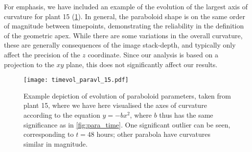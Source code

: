 For emphasis, we have included an example of the evolution of the largest axis
of curvature for plant 15 (\cref{fig:timeevol_ex}). In general, the paraboloid
shape is on the same order of magnitude between timepoints, demonstrating the reliability in
the definition of the geometric apex. While there are some variations in the
overall curvature, these are generally consequences of the image stack-depth,
and typically only affect the precision of the $z$ coordinate. Since our
analysis is based on a projection to the $xy$ plane, this does not
significantly affect our results.


\begin{figure}[H]
  \centering
  \texttt{[image: timevol\_paravl\_15.pdf]}
  \caption[Example of paraboloid shape evolution]{Example depiction of evolution
    of paraboloid parameters, taken from plant 15, where
    we have here visualised the axes of curvature according to the equation
    $y = -bx^2$, where $b$ thus has the same significance as in
    \cref{fig:para_time}. One significant outlier can be seen, corresponding to
    $t = 48$ hours; other parabola have curvatures similar in magnitude.}
  \label{fig:timeevol_ex}
\end{figure}
